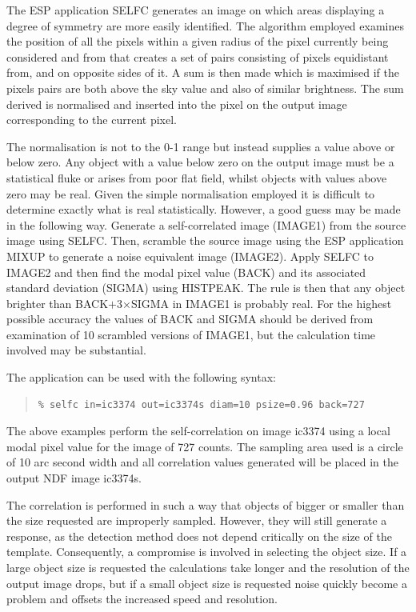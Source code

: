 \documentclass[twoside,11pt]{article}
\newenvironment{myquote}{\begin{quote}\begin{small}}{\end{small}\end{quote}}
\begin{document}
The ESP application SELFC generates an image on which areas 
displaying a degree of symmetry are more easily identified. The algorithm 
employed examines the position of all the pixels within a given radius of 
the pixel currently being considered and from that creates a set of pairs 
consisting of pixels equidistant from, and on opposite sides of it. A 
sum is then made which is maximised if the pixels pairs are both above 
the sky value and also of similar brightness. The sum derived is 
normalised and inserted into the pixel on the output image corresponding 
to the current pixel. 

The normalisation is not to the 0-1 range but instead supplies a value above 
or below zero. Any object with a value below zero on the output image 
must be a statistical fluke or arises from poor flat field, whilst
objects with values above zero may be real. Given the simple normalisation 
employed it is difficult to determine exactly what is real statistically. 
However, a good guess may be made in the following way. Generate a 
self-correlated image (IMAGE1) from the source image using SELFC. Then, 
scramble the source image using the ESP application MIXUP to generate 
a noise equivalent image (IMAGE2). Apply SELFC to IMAGE2 and then find 
the modal pixel value (BACK) and its associated standard deviation (SIGMA) using 
HISTPEAK. The rule is then that any object brighter than BACK$+$3$\times$SIGMA 
in IMAGE1 is probably real. For the highest possible accuracy the values 
of BACK and SIGMA should be derived from examination of 10 scrambled versions 
of IMAGE1, but the calculation time involved may be substantial. 

The application can be used with the following syntax:

\begin{myquote}
\begin{verbatim}
% selfc in=ic3374 out=ic3374s diam=10 psize=0.96 back=727
\end{verbatim}
\end{myquote}

The above examples perform the self-correlation on image ic3374 using a local
modal pixel value for the image of 727 counts. The sampling area used is 
a circle of 10 arc second width and all correlation values generated 
will be placed in the output NDF image ic3374s.

The correlation is performed in such a way that objects of
bigger or smaller than the size requested are improperly sampled. However, 
they will still generate a response, as the detection method does not depend
critically on the size of the template. Consequently, a compromise is 
involved in selecting the object size. If a large object size is requested 
the calculations take longer and the resolution of the output image drops, 
but if a small object size is requested noise quickly 
become a problem and offsets the increased speed and resolution.
\end{document}

